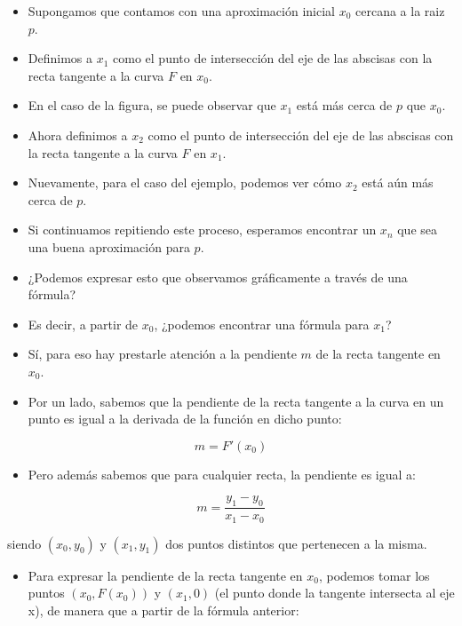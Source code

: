 \documentclass[openany]{book}
\providecommand{\tightlist}{%
  \setlength{\itemsep}{0pt}\setlength{\parskip}{0pt}}
\begin{document}
\begin{itemize}
\item
  Supongamos que contamos con una aproximación inicial \(x_0\) cercana a la raiz \(p\).
\item
  Definimos a \(x_1\) como el punto de intersección del eje de las abscisas con la recta tangente a la curva \(F\) en \(x_0\).
\item
  En el caso de la figura, se puede observar que \(x_1\) está más cerca de \(p\) que \(x_0\).
\item
  Ahora definimos a \(x_2\) como el punto de intersección del eje de las abscisas con la recta tangente a la curva \(F\) en \(x_1\).
\item
  Nuevamente, para el caso del ejemplo, podemos ver cómo \(x_2\) está aún más cerca de \(p\).
\item
  Si continuamos repitiendo este proceso, esperamos encontrar un \(x_n\) que sea una buena aproximación para \(p\).
\item
  ¿Podemos expresar esto que observamos gráficamente a través de una fórmula?
\item
  Es decir, a partir de \(x_0\), ¿podemos encontrar una fórmula para \(x_1\)?
\item
  Sí, para eso hay prestarle atención a la pendiente \(m\) de la recta tangente en \(x_0\).
\item
  Por un lado, sabemos que la pendiente de la recta tangente a la curva en un punto es igual a la derivada de la función en dicho punto:
\end{itemize}

\begin{equation}
\label{eq:deriv1}
m = F'(x_0)
\end{equation}

\begin{itemize}
\tightlist
\item
  Pero además sabemos que para cualquier recta, la pendiente es igual a:
\end{itemize}

\begin{equation}
\label{eq:deriv2}
m = \frac{y_1 - y_0}{x_1 - x_0}
\end{equation}

siendo \((x_0, y_0)\) y \((x_1, y_1)\) dos puntos distintos que pertenecen a la misma.

\begin{itemize}
\tightlist
\item
  Para expresar la pendiente de la recta tangente en \(x_0\), podemos tomar los puntos \((x_0, F(x_0))\) y \((x_1, 0)\) (el punto donde la tangente intersecta al eje x), de manera que a partir de la fórmula anterior:
\end{itemize}
\end{document}
